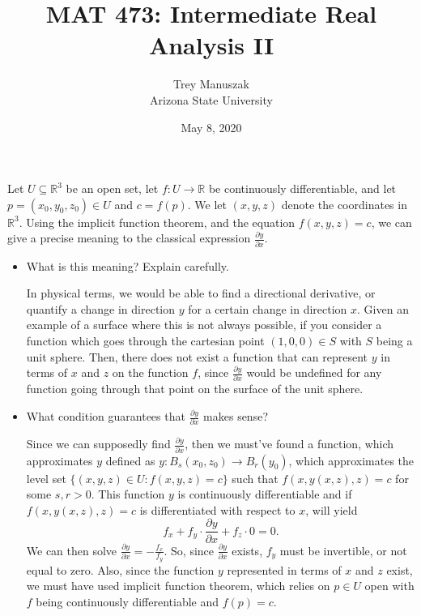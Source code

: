 \documentclass[12pt]{article}
\title{MAT 473: Intermediate Real Analysis II}
\date{May 8, 2020}
\author{Trey Manuszak\\ Arizona State University}
\newenvironment{problem}[2][Problem]{\begin{trivlist}
\item[\hskip \labelsep {\bfseries #1}\hskip \labelsep {\bfseries
#2.}]}{\end{trivlist}}
\begin{document}


\maketitle
\newpage


\begin{problem}{1}
Let $U \subseteq \mathbb{R}^{3}$ be an open set, let $f : U \to \mathbb{R}$ be continuously differentiable, and let $p = (x_0, y_0, z_0) \in U$ and $c = f(p)$. We let $(x,y,z)$ denote the coordinates in $\mathbb{R}^3$. Using the implicit function theorem, and the equation $f(x,y,z) = c$, we can give a precise meaning to the classical expression $\frac{\partial y}{\partial x}$.
\begin{itemize}
  \item[(a)] What is this meaning? Explain carefully.
  
  \hspace{1em} In physical terms, we would be able to find a directional derivative, or quantify a change in direction $y$ for a certain change in direction $x$. Given an example of a surface where this is not always possible, if you consider a function which goes through the cartesian point $(1,0,0) \in S$ with $S$ being a unit sphere. Then, there does not exist a function that can represent $y$ in terms of $x$ and $z$ on the function $f$, since $\frac{\partial y}{\partial x}$ would be undefined for any function going through that point on the surface of the unit sphere. 

  \item[(b)] What condition guarantees that $\frac{\partial y}{\partial x}$ makes sense?
  
  \hspace{1em} Since we can supposedly find $\frac{\partial y}{\partial x}$, then we must've found a function, which approximates $y$ defined as $y : B_s(x_0,z_0) \to B_r(y_0)$, which approximates the level set $\{(x,y,z) \in U : f(x,y,z) = c\}$ such that $f(x,y(x,z),z) = c$ for some $s,r > 0$. This function $y$ is continuously differentiable and if $f(x,y(x,z),z) = c$ is differentiated with respect to $x$, will yield $$f_x + f_y \cdot \frac{\partial y}{\partial x} + f_z \cdot 0 = 0.$$ We can then solve $\frac{\partial y}{\partial x} = -\frac{f_x}{f_y}$. So, since $\frac{\partial y}{\partial x}$ exists, $f_y$ must be invertible, or not equal to zero. Also, since the function $y$ represented in terms of $x$ and $z$ exist, we must have used implicit function theorem, which relies on $p \in U$ open with $f$ being continuously differentiable and $f(p) = c$.
  

\end{itemize}
\end{problem}
\end{document}
